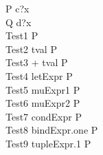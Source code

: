 \begin{circus}
    \circprocess P \circdef \circbegin \circspot c?x \then \Skip \circend \\
    \circprocess Q \circdef \circbegin \circspot d?x \then \Skip \circend \\

   
    \circprocess Test1 \circdef {} \rcirctime \circstartby P \\
    \circprocess Test2 \circdef \lcirctime tval \rcirctime \circstartby P \\
    \circprocess Test3 \circdef {} + tval \rcirctime \circstartby P \\
    \circprocess Test4 \circdef \lcirctime letExpr \rcirctime \circstartby P \\
    \circprocess Test5 \circdef \lcirctime muExpr1 \rcirctime \circstartby P \\
    \circprocess Test6 \circdef \lcirctime muExpr2 \rcirctime \circstartby P \\
    \circprocess Test7 \circdef \lcirctime condExpr \rcirctime \circstartby P \\
    \circprocess Test8 \circdef \lcirctime bindExpr.one \rcirctime \circstartby P \\
    \circprocess Test9 \circdef \lcirctime tupleExpr.1 \rcirctime \circstartby P \\






\end{circus}
